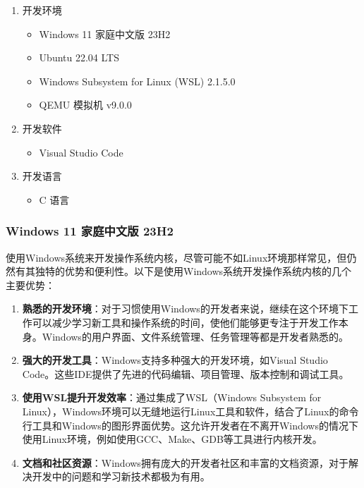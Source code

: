 \begin{enumerate}
    \item 开发环境
          \begin{itemize}
              \item Windows 11 家庭中文版 23H2
              \item Ubuntu 22.04 LTS
              \item Windows Subsystem for Linux (WSL) 2.1.5.0
              \item QEMU 模拟机 v9.0.0
          \end{itemize}
    \item 开发软件
          \begin{itemize}
              \item Visual Studio Code
          \end{itemize}
    \item 开发语言
          \begin{itemize}
              \item C 语言
          \end{itemize}
\end{enumerate}

\subsubsection{Windows 11 家庭中文版 23H2}

使用Windows系统来开发操作系统内核，尽管可能不如Linux环境那样常见，但仍然有其独特的优势和便利性。以下是使用Windows系统开发操作系统内核的几个主要优势：

\begin{enumerate}
    \item \textbf{熟悉的开发环境}：对于习惯使用Windows的开发者来说，继续在这个环境下工作可以减少学习新工具和操作系统的时间，使他们能够更专注于开发工作本身。Windows的用户界面、文件系统管理、任务管理等都是开发者熟悉的。
    \item \textbf{强大的开发工具}：Windows支持多种强大的开发环境，如Visual Studio Code。这些IDE提供了先进的代码编辑、项目管理、版本控制和调试工具。
    \item \textbf{使用WSL提升开发效率}：通过集成了WSL（Windows Subsystem for Linux），Windows环境可以无缝地运行Linux工具和软件，结合了Linux的命令行工具和Windows的图形界面优势。这允许开发者在不离开Windows的情况下使用Linux环境，例如使用GCC、Make、GDB等工具进行内核开发。
    \item \textbf{文档和社区资源}：Windows拥有庞大的开发者社区和丰富的文档资源，对于解决开发中的问题和学习新技术都极为有用。
\end{enumerate}

